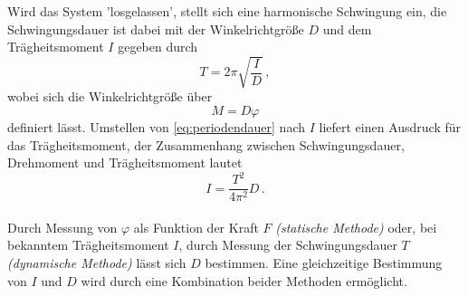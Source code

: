 Wird das System 'losgelassen', stellt sich eine harmonische Schwingung ein, die Schwingungsdauer ist dabei mit der Winkelrichtgröße $D$ und dem Trägheitsmoment $I$ gegeben durch
\begin{equation}
    T = 2 π \sqrt{\frac{I}{D}}\,,
    \label{eq:periodendauer}
\end{equation}
wobei sich die Winkelrichtgröße über
\begin{equation}
    M = D \varphi
    \label{eq:winkelrichtgröße}
\end{equation}
definiert lässt. 
Umstellen von \eqref{eq:periodendauer} nach $I$ liefert einen Ausdruck für das Trägheitsmoment, der Zusammenhang zwischen Schwingungsdauer, Drehmoment und Trägheitsmoment lautet
\begin{equation}
    I = \frac{T^2}{4 π^2} D \,.
    \label{eq:trägüschwi}
\end{equation}\\

Durch Messung von $\varphi$ als Funktion der Kraft $F$ \textit{(statische Methode)} oder, bei bekanntem Trägheitsmoment $I$, durch Messung der Schwingungsdauer $T$ \textit{(dynamische Methode)} lässt sich
$D$ bestimmen. Eine gleichzeitige Bestimmung von $I$ und $D$ wird durch eine Kombination beider Methoden ermöglicht. 



